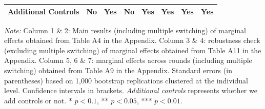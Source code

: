 \documentclass[12pt]{article}
\begin{document}
\begin{table}[H]
\begin{tabular}{l*{7}{c}}
\addlinespace[1.5em]
Additional Controls &No &Yes & No&Yes & Yes& Yes& Yes \\
\bottomrule
\end{tabular}
\begin{tablenotes}[flushleft]
\small
\item \textit{Note:} Column 1 \& 2: Main results (including multiple switching) of marginal effects obtained from Table A4 in the Appendix. Column 3 \& 4: robustness check (excluding multiple switching) of marginal effects obtained from Table A11 in the Appendix. Column 5, 6 \& 7: marginal effects across rounds (including multiple switching) obtained from Table A9 in the Appendix.  Standard errors (in parentheses) based on 1,000 bootstrap replications clustered at the individual level. Confidence intervals in brackets. \textit{Additional controls} represents whether we add controls or not. * $p<0.1$, ** $p<0.05$, *** $p<0.01$.
\end{tablenotes}
\label{tab:results}
\end{table}
\end{document}
